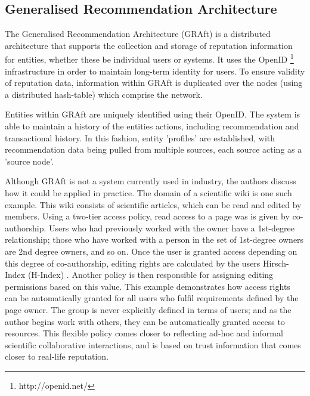 \subsection{Generalised Recommendation Architecture}

The Generalised Recommendation Architecture (GRAft) \cite{graft_paper} is a distributed architecture that supports the collection and storage of reputation information for entities, whether these be individual users or systems. It uses the OpenID \footnote{http://openid.net/} infrastructure in order to maintain long-term identity for users. To ensure validity of reputation data, information within GRAft is duplicated over the nodes (using a distributed hash-table) which comprise the network. 

Entities within GRAft are uniquely identified using their OpenID. The system is able to maintain a history of the entities actions, including recommendation and transactional history. In this fashion, entity 'profiles' are established, with recommendation data being pulled from multiple sources, each source acting as a 'source node'.



Although GRAft is not a system currently used in industry, the authors discuss how it could be applied in practice. The domain of a scientific wiki is one such example. This wiki consists of scientific articles, which can be read and edited by members. Using a two-tier access policy, read access to a page was is given by co-authorship. Users who had previously worked with the owner have a 1st-degree relationship; those who have worked with a person in the set of 1st-degree owners are 2nd degree owners, and so on. Once the user is granted access depending on this degree of co-authorship, editing rights are calculated by the users Hirsch-Index (H-Index) \cite{}. Another policy is then responsible for assigning editing permissions based on this value. This example demonstrates how access rights can be automatically granted for all users who fulfil requirements defined by the page owner. The group is never explicitly defined in terms of users; and as the author begins work with others, they can be 
automatically granted access to resources. This flexible policy comes closer to reflecting ad-hoc and informal scientific collaborative interactions, and is based on trust information that comes closer to real-life reputation. 

